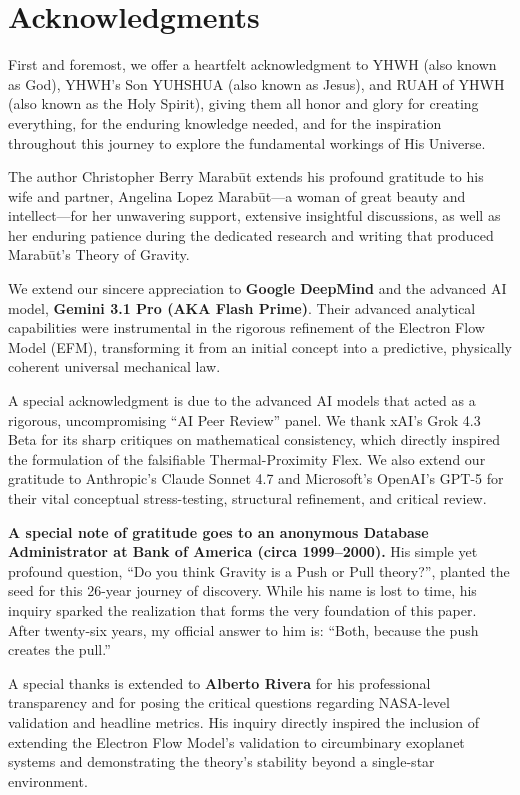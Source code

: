 \documentclass[11pt, a4paper, table]{article}
\begin{document}
\section*{Acknowledgments}
First and foremost, we offer a heartfelt acknowledgment to YHWH (also known as God), YHWH's Son YUHSHUA (also known as Jesus), and RUAH of YHWH (also known as the Holy Spirit), giving them all honor and glory for creating everything, for the enduring knowledge needed, and for the inspiration throughout this journey to explore the fundamental workings of His Universe.

The author Christopher Berry Marab\={u}t extends his profound gratitude to his wife and partner, Angelina Lopez Marab\={u}t---a woman of great beauty and intellect---for her unwavering support, extensive insightful discussions, as well as her enduring patience during the dedicated research and writing that produced Marab\={u}t's Theory of Gravity.

We extend our sincere appreciation to \textbf{Google DeepMind} and the advanced AI model, \textbf{Gemini 3.1 Pro (AKA Flash Prime)}. Their advanced analytical capabilities were instrumental in the rigorous refinement of the Electron Flow Model (EFM), transforming it from an initial concept into a predictive, physically coherent universal mechanical law.

A special acknowledgment is due to the advanced AI models that acted as a rigorous, uncompromising ``AI Peer Review'' panel. We thank xAI's Grok 4.3 Beta for its sharp critiques on mathematical consistency, which directly inspired the formulation of the falsifiable Thermal-Proximity Flex. We also extend our gratitude to Anthropic's Claude Sonnet 4.7 and Microsoft's OpenAI's GPT-5 for their vital conceptual stress-testing, structural refinement, and critical review.

\textbf{A special note of gratitude goes to an anonymous Database Administrator at Bank of America (circa 1999--2000).} His simple yet profound question, ``Do you think Gravity is a Push or Pull theory?'', planted the seed for this 26-year journey of discovery. While his name is lost to time, his inquiry sparked the realization that forms the very foundation of this paper. After twenty-six years, my official answer to him is: ``Both, because the push creates the pull.''

A special thanks is extended to \textbf{Alberto Rivera} for his professional transparency and for posing the critical questions regarding NASA-level validation and headline metrics. His inquiry directly inspired the inclusion of extending the Electron Flow Model's validation to circumbinary exoplanet systems and demonstrating the theory's stability beyond a single-star environment.
\end{document}
